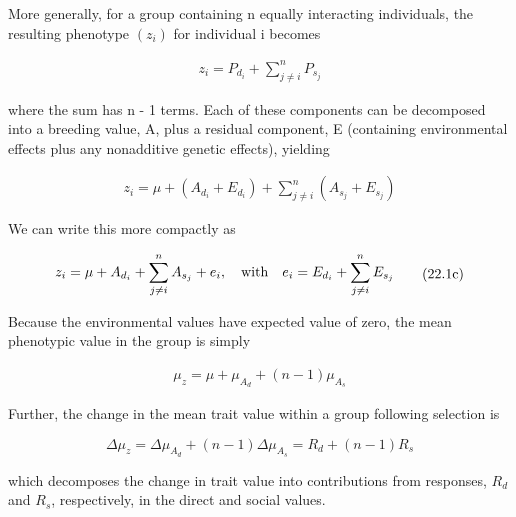 \documentclass{article}
\begin{document}
More generally, for a group containing n equally interacting individuals, the resulting phenotype  $ (z_{i}) $ for individual i becomes

\begin{equation}
\begin{align*}z_i=P_{d_i}+\sum\limits_{j\ne i}^n P_{s_j}\end{align*}
\tag{22.1a}
\label{eq:22_1a}
\end{equation}

where the sum has n - 1 terms. Each of these components can be decomposed into a breeding value, A, plus a residual component, E (containing environmental effects plus any nonadditive genetic effects), yielding

\begin{equation}
\begin{align*}z_i=\mu+(A_{d_i}+E_{d_i})+\sum\limits_{j\neq i}^n\left(A_{s_j}+E_{s_j}\right)\end{align*}
\tag{22.1b}
\label{eq:22_1b}
\end{equation}

We can write this more compactly as

\begin{equation}
\begin{align*}z_i=\mu+A_{d_i}+\sum\limits_{j\ne i}^n A_{s_j}+e_i,\quad{\rm with}\quad e_i=E_{d_i}+\sum\limits_{j\ne i}^n E_{s_j}\end{align*}
\tag{22.1c}
\label{eq:22_1c}
\end{equation}

Because the environmental values have expected value of zero, the mean phenotypic value in the group is simply

\begin{equation}
\begin{align*}\mu_z=\mu+\mu_{A_d}+(n-1)\mu_{A_s}\end{align*}
\tag{22.1d}
\label{eq:22_1d}
\end{equation}

Further, the change in the mean trait value within a group following selection is

\begin{equation}
\Delta\mu_{z}=\Delta\mu_{A_{d}}+(n-1)\Delta\mu_{A_{s}}=R_{d}+(n-1)R_{s}
\tag{22.1e}
\label{eq:22_1e}
\end{equation}

which decomposes the change in trait value into contributions from responses,  $ R_{d} $ and  $ R_{s} $, respectively, in the direct and social values.
\end{document}
